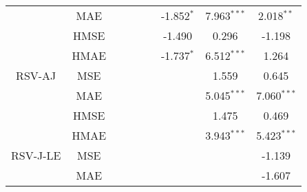 \documentclass[10pt]{article}
\begin{document}
\begin{landscape}
\begin{center}
\begin{tabular}{c|c|ccccccc}
                       &  MAE            &                    &                                 &                                 &                                   &-1.852$^{\ast}$                &7.963$^{\ast \ast \ast}$&2.018$^{\ast \ast}$            \\
                       &  HMSE          &                    &                                 &                                 &                                  &-1.490                             &0.296                          &-1.198            \\
                       &  HMAE          &                    &                                &                                  &                                  & -1.737$^{\ast}$                &6.512$^{\ast \ast \ast}$&1.264            \\  \hline 
RSV-AJ           &  MSE            &                    &                                &                                  &                                  &                                     &1.559                           & 0.645           \\
                       &  MAE            &                    &                                &                                  &                                  &                                     &5.045$^{\ast \ast \ast}$  & 7.060$^{\ast \ast \ast}$            \\
                       &  HMSE          &                    &                                &                                  &                                  &                                     &1.475                            & 0.469             \\
                       &  HMAE          &                    &                                &                                  &                                  &                                     &3.943$^{\ast \ast \ast}$  &5.423$^{\ast \ast \ast}$            \\  \hline
RSV-J-LE       &  MSE            &                    &                                &                                  &                                  &                                     &                                      &-1.139             \\
                       &  MAE            &                    &                                &                                  &                                  &                                     &                                   &-1.607             \\

\end{tabular}
\end{center}
\end{landscape}
\end{document}
